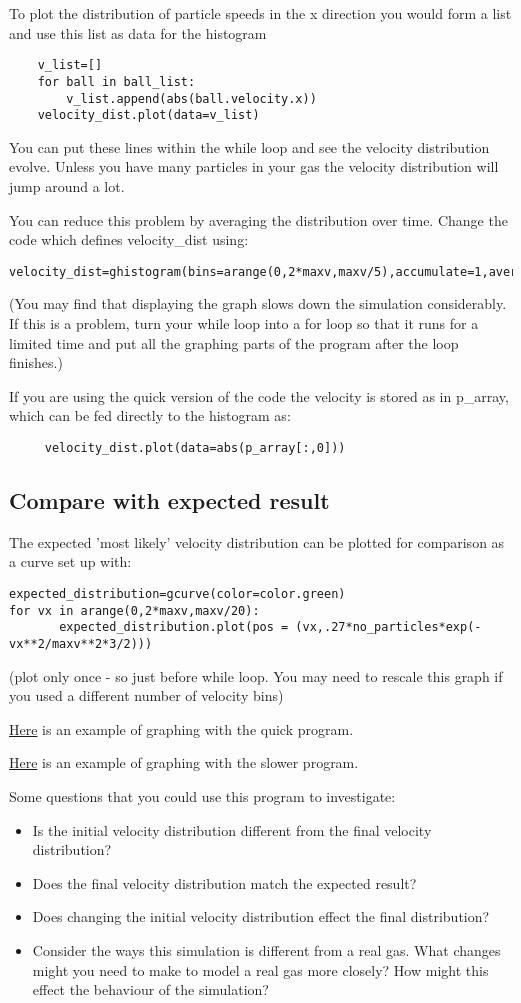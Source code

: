 \documentclass[12pt]{article}
\begin{document}
To plot the distribution of particle speeds in the x direction you would form a list and use
this list as data for the histogram
{\color{code}\begin{verbatim}
    v_list=[]
    for ball in ball_list:
        v_list.append(abs(ball.velocity.x))
    velocity_dist.plot(data=v_list)
\end{verbatim}}
You can put these lines within the while loop and see the velocity distribution evolve.
Unless you have many particles in your gas the velocity distribution will jump around a lot.

You can reduce this problem by averaging the distribution over time.
Change the code which defines {\color{code}velocity\_dist} using:
{\color{code}\begin{verbatim}
velocity_dist=ghistogram(bins=arange(0,2*maxv,maxv/5),accumulate=1,average=1)
\end{verbatim}}
(You may find that displaying the graph slows down the simulation considerably.
If this is a problem, turn your while loop into a for loop so that it runs for a limited time
and put all the graphing parts of the program after the loop finishes.)

If you are using the quick version of the code the velocity is
stored as in {\color{code}p\_array}, which can be fed directly to
the histogram as: {\color{code}\begin{verbatim}
     velocity_dist.plot(data=abs(p_array[:,0]))
\end{verbatim}}
\subsection{Compare with expected result}
The expected 'most likely' velocity distribution can be plotted for comparison as a curve set
up with:
{\color{code}\begin{verbatim}
expected_distribution=gcurve(color=color.green)
for vx in arange(0,2*maxv,maxv/20):
       expected_distribution.plot(pos = (vx,.27*no_particles*exp(-vx**2/maxv**2*3/2)))
\end{verbatim}}
(plot only once - so just before while loop. You may need to rescale this graph if you
used a different number of velocity bins)

\href{quickbouncepdist.html}{Here} is an example of graphing with the quick program.

\href{manybouncepdist.html}{Here} is an example of graphing with the slower program.

Some questions that you could use this program to investigate:
\begin{itemize}
\item {Is the initial velocity distribution different from the final velocity distribution?}
\item{Does the final velocity distribution match the expected result?}
\item{Does changing the initial velocity distribution effect the final distribution?}
\item{Consider the ways this simulation is different from a real gas.
What changes might you need to make to model a real gas more closely?
How might this effect the behaviour of the simulation?}
\end{itemize}
\end{document}
